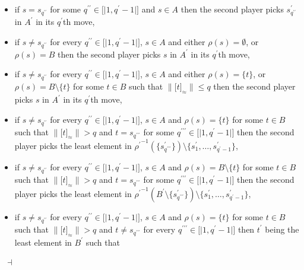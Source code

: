 \documentclass[draft]{article}
\newenvironment{proof}{{\bf Proof:}}{~$\dashv$\\}
\def\lsem{{\lbrack\mid}}
\def\rsem{{\mid\rbrack}}
\begin{document}
\begin{proof}
\begin{itemize}
\begin{itemize}
\begin{itemize}
%
%
\end{itemize}
%
%
\end{itemize}
%
%
in its $q^{\prime}$th move,
%
%
\item if $s{=}s_{q^{\prime\prime}}$ for some $q^{\prime\prime}{\in}\lsem1,q^{\prime}{-}1\rsem$ and $s{\in}A$ then the second player picks $s^{\prime}_{q^{\prime\prime}}$ in $A^{\prime}$ in its $q^{\prime}$th move,
%
%
\item if $s{\not=}s_{q^{\prime\prime}}$ for every $q^{\prime\prime}{\in}\lsem1,q^{\prime}{-}1\rsem$, $s{\in}A$ and either $\rho(s){=}\emptyset$, or $\rho(s){=}B$ then the second player picks $s$ in $A^{\prime}$ in its $q^{\prime}$th move,
%
%
\item if $s{\not=}s_{q^{\prime\prime}}$ for every $q^{\prime\prime}{\in}\lsem1,q^{\prime}{-}1\rsem$, $s{\in}A$ and either $\rho(s){=}\{t\}$, or $\rho(s){=}B{\setminus}\{t\}$ for some $t{\in}B$ such that ${\parallel}\lbrack t\rbrack_{\approx}{\parallel}{\leq}q$ then the second player picks $s$ in $A^{\prime}$ in its $q^{\prime}$th move,
%
%
\item if $s{\not=}s_{q^{\prime\prime}}$ for every $q^{\prime\prime}{\in}\lsem1,q^{\prime}{-}1\rsem$, $s{\in}A$ and $\rho(s){=}\{t\}$ for some $t{\in}B$ such that ${\parallel}\lbrack t\rbrack_{\approx}{\parallel}{>}q$ and $t{=}s_{q^{\prime\prime\prime}}$ for some $q^{\prime\prime\prime}{\in}\lsem1,q^{\prime}{-}1\rsem$ then the second player picks the least element in ${\rho^{\prime}}^{{-}1}(\{s^{\prime}_{q^{\prime\prime\prime}}\}){\setminus}\{s^{\prime}_{1},\ldots,s^{\prime}_{q^{\prime}{-}1}\}$,
%
%
\item if $s{\not=}s_{q^{\prime\prime}}$ for every $q^{\prime\prime}{\in}\lsem1,q^{\prime}{-}1\rsem$, $s{\in}A$ and $\rho(s){=}B{\setminus}\{t\}$ for some $t{\in}B$ such that ${\parallel}\lbrack t\rbrack_{\approx}{\parallel}{>}q$ and $t{=}s_{q^{\prime\prime\prime}}$ for some $q^{\prime\prime\prime}{\in}\lsem1,q^{\prime}{-}1\rsem$ then the second player picks the least element in ${\rho^{\prime}}^{{-}1}(B^{\prime}{\setminus}\{s^{\prime}_{q^{\prime\prime\prime}}\}){\setminus}\{s^{\prime}_{1},\ldots,s^{\prime}_{q^{\prime}{-}1}\}$,
%
%
\item if $s{\not=}s_{q^{\prime\prime}}$ for every $q^{\prime\prime}{\in}\lsem1,q^{\prime}{-}1\rsem$, $s{\in}A$ and $\rho(s){=}\{t\}$ for some $t{\in}B$ such that ${\parallel}\lbrack t\rbrack_{\approx}{\parallel}{>}q$ and $t{\not=}s_{q^{\prime\prime\prime}}$ for every $q^{\prime\prime\prime}{\in}\lsem1,q^{\prime}{-}1\rsem$ then $t^{\prime}$ being the least element in $B^{\prime}$ such that

\end{itemize}
\end{proof}
\end{document}
